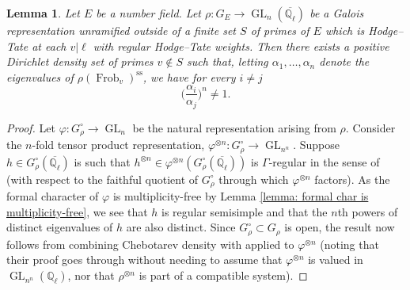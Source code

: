 \documentclass{amsart}
\newtheorem{lemma}[theorem]{Lemma}
\theoremstyle{definition}
\numberwithin{equation}{section} %
\newcommand{\GL}{\operatorname{GL}}
\newcommand{\Qlbar}{\ensuremath{\overline{\mathbb{Q}_\ell}}}
\newcommand{\Frob}{\operatorname{Frob}}
\newcommand{\bb}[1]{\mathbb{#1}}
\begin{document}
\begin{lemma}\label{lemma: generic element of image}
Let $E$ be a number field.
Let $\rho: G_E \to \GL_n(\Qlbar)$ be a Galois representation unramified outside of a finite set $S$ of primes of $E$ which is Hodge--Tate at each $v|\ell$ with regular Hodge--Tate weights.
Then there exists a positive Dirichlet density set of primes $v \not\in S$ such that, letting $\alpha_1,\ldots,\alpha_n$ denote the eigenvalues of $\rho(\Frob_v)^{\mathrm{ss}}$, we have for every $i \neq j$
\[
\big(\frac{\alpha_i}{\alpha_j}\big)^n \neq 1.
\]
\end{lemma}
\begin{proof}
Let $\varphi: G_{\rho}^\circ \to \GL_n$ be the natural representation arising from $\rho$.
Consider the $n$-fold tensor product representation, $\varphi^{\otimes n}: G_{\rho}^\circ \to \GL_{n^n}$.
Suppose $h \in G_{\rho}^\circ(\Qlbar)$ is such that $h^{\otimes n} \in \varphi^{\otimes n}(G_{\rho}^\circ(\Qlbar))$ is $\Gamma$-regular in the sense of \cite[Definition 4.5]{LarPin92} (with respect to the faithful quotient of $G_{\rho}^\circ$ through which $\varphi^{\otimes n}$ factors).
As the formal character of $\varphi$ is multiplicity-free by Lemma \ref{lemma: formal char is multiplicity-free}, we see that $h$ is regular semisimple and that the $n$th powers of distinct eigenvalues of $h$ are also distinct.
Since $G_{\rho}^\circ \subset G_{\rho}$ is open, the result now follows from combining Chebotarev density with \cite[Proposition 7.2]{LarPin92} applied to $\varphi^{\otimes n}$ (noting that their proof goes through without needing to assume that $\varphi^{\otimes n}$ is valued in $\GL_{n^n}(\bb{Q}_\ell)$, nor that $\rho^{\otimes n}$ is part of a compatible system).
\end{proof}
\end{document}
